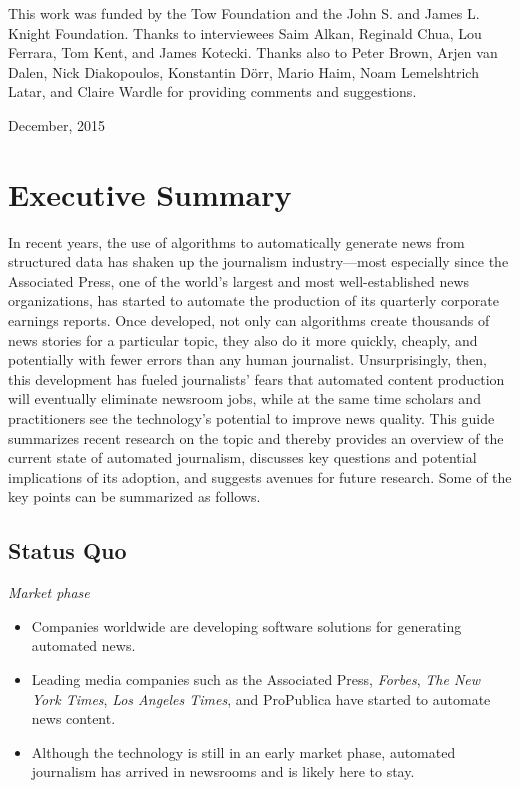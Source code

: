 \documentclass[notoc, symmetric, nobib, nols]{towcenter-book}
\begin{document}
This work was funded by the Tow Foundation and the John S. and James L. Knight Foundation. Thanks to interviewees Saim Alkan, Reginald Chua, Lou Ferrara, Tom Kent, and James Kotecki. Thanks also to Peter Brown, Arjen van Dalen, Nick Diakopoulos, Konstantin Dörr, Mario Haim, Noam Lemelshtrich Latar, and Claire Wardle for providing comments and suggestions.

December, 2015




 
\chapter{Executive Summary}

In recent years, the use of algorithms to automatically generate news from structured data has shaken up the journalism industry---most especially since the Associated Press, one of the world’s largest and most well-established news organizations, has started to automate the production of its quarterly corporate earnings reports. Once developed, not only can algorithms create thousands of news stories for a particular topic, they also do it more quickly, cheaply, and potentially with fewer errors than any human journalist. Unsurprisingly, then, this development has fueled journalists’ fears that automated content production will eventually eliminate newsroom jobs, while at the same time scholars and practitioners see the technology’s potential to improve news quality. This guide summarizes recent research on the topic and thereby provides an overview of the current state of automated journalism, discusses key questions and potential implications of its adoption, and suggests avenues for future research. Some of the key points can be summarized as follows.

\section{Status Quo}

\textit{Market phase} 
\begin{itemize}
\item Companies worldwide are developing software solutions for generating automated news.
\item Leading media companies such as the Associated Press, \textit{Forbes}, \textit{The New York Times}, \textit{Los Angeles Times}, and ProPublica have started to automate news content.
\item Although the technology is still in an early market phase, automated journalism has arrived in newsrooms and is likely here to stay. 
\end{itemize}
\end{document}
